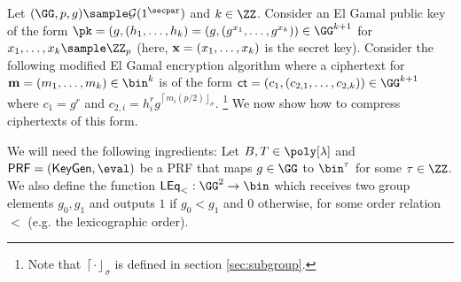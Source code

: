 Let $(\GG, p, g) \sample \mathcal{G}(1^\secpar)$ and $k\in\ZZ$. Consider an El Gamal public key of the form $\pk=(g,(h_1,\dots, h_k)=(g,(g^{x_1},\dots, g^{x_k}))\in\GG^{k+1}$ for $x_1,\dots, x_k\sample \ZZ_p$ (here, $\mathbf{x}=(x_1,\dots, x_k)$ is the secret key). Consider the following modified El Gamal encryption algorithm where a ciphertext for  $\mn=(m_1,\dots, m_k)\in\bin^k$ is of the form $\ct=(c_1,(c_{2,1},\dots, c_{2,k}))\in\GG^{k+1}$ where $c_1=g^r$ and $c_{2,i}=h_i^rg^{\left\lceil m_i(p/2)\right\rfloor_\sigma}$. \footnote{Note that $\left\lceil \cdot\right\rfloor_\sigma$ is defined in section \ref{sec:subgroup}.}
We now show how to compress ciphertexts of this form.

We will need the following ingredients: Let $B,T\in\poly[\lambda]$ and $\PRF=(\keygen,\eval)$ be a PRF that maps $g\in\GG$ to $\bin^\tau$ for some $\tau\in\ZZ$. We also define the function $\mathsf{LEq}_<:\GG^2\to \bin$ which receives two group elements $g_0,g_1$ and outputs $1$ if $g_0<g_1$ and $0$ otherwise, for some order relation $<$ (e.g. the lexicographic order).



